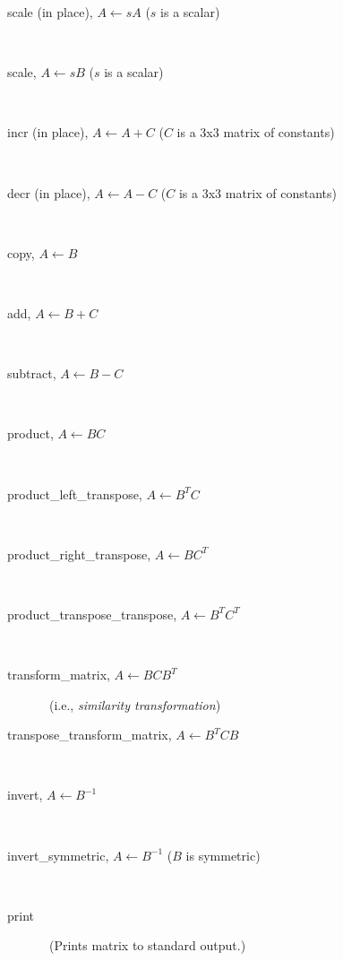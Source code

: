 \begin{description}
  \item[scale (in place), $A\leftarrow sA$ ($s$ is a scalar)]\ \newline

  \item[scale, $A\leftarrow sB$ ($s$ is a scalar)]\ \newline

  \item[incr (in place), $A\leftarrow A + C$ ($C$ is a 3x3 matrix of constants)]\ \newline

  \item[decr (in place), $A\leftarrow A - C$ ($C$ is a 3x3 matrix of constants)]\ \newline

  \item[copy, $A \leftarrow B$]\ \newline

  \item[add, $A \leftarrow B+C$]\ \newline

  \item[subtract, $A \leftarrow B-C$]\ \newline

  \item[product, $A \leftarrow BC$]\ \newline

  \item[product\_left\_transpose, $A \leftarrow B^TC$]\ \newline

  \item[product\_right\_transpose, $A \leftarrow BC^T$]\ \newline

  \item[product\_transpose\_transpose, $A \leftarrow B^T C^T$]\ \newline

  \item[transform\_matrix, $A \leftarrow BCB^T$]\ (i.e., {\it similarity transformation})\newline

  \item[transpose\_transform\_matrix, $A \leftarrow B^T CB$]\ \newline

  \item[invert, $A \leftarrow B^{-1}$]\ \newline

  \item[invert\_symmetric, $A \leftarrow B^{-1}$ ($B$ is symmetric)]\ \newline

  \item[print]\ (Prints matrix to standard output.)\newline

\end{description}

